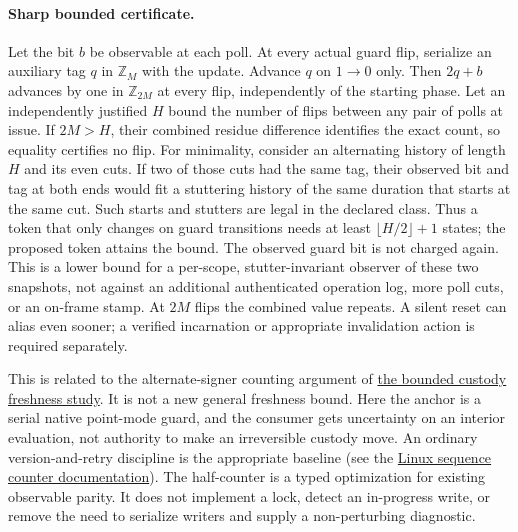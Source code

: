 \documentclass[11pt]{article}
\begin{document}
\paragraph{Sharp bounded certificate.}
Let the bit \(b\) be observable at each poll. At every actual guard
flip, serialize an auxiliary tag \(q\) in \(\mathbb Z_M\) with the
update. Advance \(q\) on \(1\to 0\) only. Then \(2q+b\) advances by one
in \(\mathbb Z_{2M}\) at every flip, independently of the starting
phase. Let an independently justified \(H\) bound the number of flips
between any pair of polls at issue. If \(2M>H\), their combined
residue difference identifies the exact count, so equality certifies
no flip. For minimality, consider an alternating history of length
\(H\) and its even cuts. If two of those cuts had the same tag,
their observed bit and tag at both ends would fit a stuttering history
of the same duration that starts at the same cut. Such starts and
stutters are legal in the declared class. Thus a token that only
changes on guard transitions needs at least
\(\lfloor H/2\rfloor+1\) states; the proposed token attains the bound.
The observed guard bit is not charged again. This is a lower bound for
a per-scope, stutter-invariant observer of these two snapshots, not
against an additional authenticated operation log, more poll cuts,
or an on-frame stamp. At \(2M\) flips the combined value repeats.
A silent reset can alias even sooner; a verified incarnation or
appropriate invalidation action is required separately.

This is related to the alternate-signer counting argument of
\href{https://github.com/eternal-november/eos-research-programmes/pull/388}{the
bounded custody freshness study}. It is not a new general freshness
bound. Here the anchor is a serial native point-mode guard, and the
consumer gets uncertainty on an interior evaluation, not authority
to make an irreversible custody move. An ordinary version-and-retry
discipline is the appropriate baseline (see the
\href{https://docs.kernel.org/locking/seqlock.html}{Linux sequence
counter documentation}). The half-counter is a typed optimization
for existing observable parity. It does not implement a lock, detect
an in-progress write, or remove the need to serialize writers and
supply a non-perturbing diagnostic.
\end{document}
